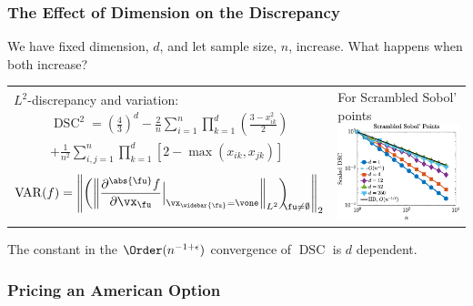 \documentclass[10pt,compress,xcolor={usenames,dvipsnames}]{beamer} %
\DeclareMathOperator{\disc}{DSC}
\DeclareMathOperator{\Var}{VAR}
\begin{document}
\begin{frame}
	\frametitle{The Effect of Dimension on the Discrepancy}
	\vspace{-5ex}
	We have fixed dimension, $d$, and  let sample size, $n$, increase.  What happens when both increase?
	
	\begin{tabular}{m{6cm}>{\centering}m{5.5cm}}
	 $L^2$-discrepancy and variation:
	 \begin{multline*}
	\disc^2 =\left(\frac 43\right)^d
	 - \frac{2}{n} \sum_{i=1}^n \prod_{k=1}^d \left (\frac{3 - x_{ik}^2}{2} \right) \\ + \frac{1}{n^2}\sum_{i,j=1}^n \prod_{k = 1}^d [2 - \max(x_{ik},x_{jk})]
	  \end{multline*}
	\[ 	\Var(f) = \Biggl \lVert \biggl ( \biggl \lVert\frac{\partial^{\abs{\fu}} f}{\partial \vx_\fu} \Bigr \rvert_{\vx_{\widebar{\fu}} = \vone}\biggr\rVert_{L^2}\biggr )_{\!\!\!\fu \ne \emptyset} \Biggr \rVert_2 \]
	 & 
	 For Scrambled Sobol' points \newline
	 \includegraphics[width = 5.5cm]{ProgramsImages/UnwtL2Disc.eps}
	\end{tabular}
	The constant in the $\Order(n^{-1+\epsilon})$ convergence of $\disc$ is \alert{$d$ dependent}.
\end{frame}

\begin{frame}
	\frametitle{Pricing an American Option}
\end{frame}
\end{document}

